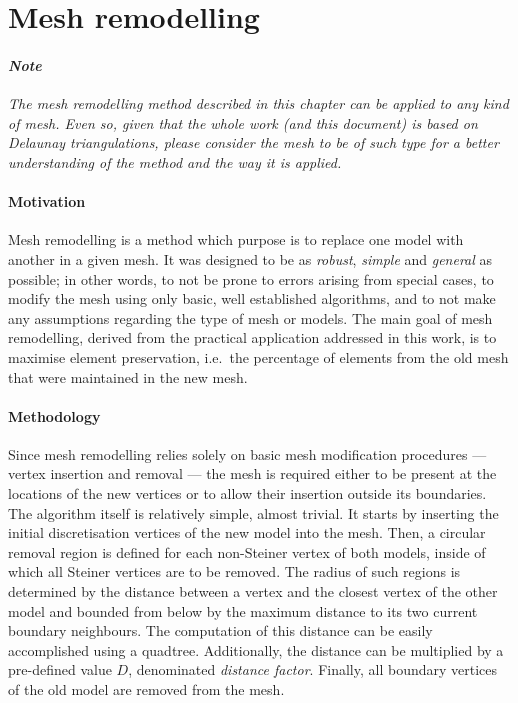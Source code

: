 \section{Mesh remodelling}

\paragraph{\textit{Note}}\textit{The mesh remodelling method described in this chapter can be applied to any kind of mesh. Even so, given that the whole work (and this document) is based on Delaunay triangulations, please consider the mesh to be of such type for a better understanding of the method and the way it is applied.}

\paragraph{Motivation} Mesh remodelling is a method which purpose is to replace one model with another in a given mesh. It was designed to be as \textit{robust}, \textit{simple} and \textit{general} as possible; in other words, to not be prone to errors arising from special cases, to modify the mesh using only basic, well established algorithms, and to not make any assumptions regarding the type of mesh or models. The main goal of mesh remodelling, derived from the practical application addressed in this work, is to maximise element preservation, i.e.\ the percentage of elements from the old mesh that were maintained in the new mesh.

\paragraph{Methodology} Since mesh remodelling relies solely on basic mesh modification procedures --- vertex insertion and removal --- the mesh is required either to be present at the locations of the new vertices or to allow their insertion outside its boundaries. The algorithm itself is relatively simple, almost trivial. It starts by inserting the initial discretisation vertices of the new model into the mesh. Then, a circular removal region is defined for each non-Steiner vertex of both models, inside of which all Steiner vertices are to be removed. The radius of such regions is determined by the distance between a vertex and the closest vertex of the other model and bounded from below by the maximum distance to its two current boundary neighbours. The computation of this distance can be easily accomplished using a quadtree. Additionally, the distance can be multiplied by a pre-defined value $D$, denominated \textit{distance factor}. Finally, all boundary vertices of the old model are removed from the mesh.

